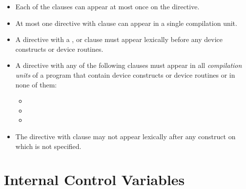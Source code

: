 \begin{itemize}

\item Each of the clauses can appear at most once on the directive.

\item At most one  directive with  
      clause can appear in a single compilation
unit.

\item A  directive with a ,
       or  clause must 
      appear lexically before any device constructs or device routines.

\item A  directive with any of the following clauses must appear 
      in all \emph{compilation units} of a program that contain device
      constructs or device routines or in none of them:

 \begin{itemize}
   \item {}
   \item {}
   \item {}
 \end{itemize}

\item The  directive with 
clause may not appear lexically after any  construct on which
 is not specified.


\end{itemize}


\section{Internal Control Variables}
\label{sec:Internal Control Variables}

